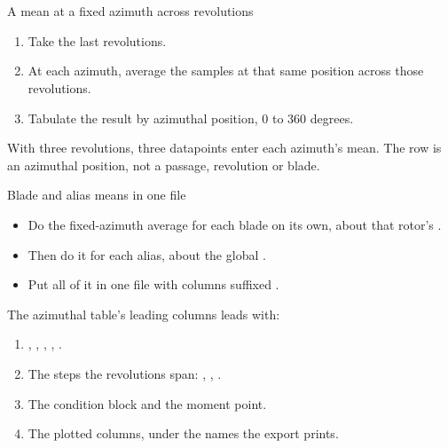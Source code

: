 %
\section{}

\begin{frame}{A mean at a fixed azimuth across revolutions}
\begin{enumerate}\small
  \item Take the last  revolutions.
  \item At each azimuth, average the samples at that same position across
        those revolutions.
  \item Tabulate the result by azimuthal position, 0 to 360 degrees.
\end{enumerate}
\begin{takeaway}
With three revolutions, three datapoints enter each azimuth's mean.
The row is an azimuthal position, not a passage, revolution or blade.
\end{takeaway}
\end{frame}

\begin{frame}{Blade and alias means in one file}
\begin{itemize}
  \item Do the fixed-azimuth average for each blade on its own, about that
        rotor's .
  \item Then do it for each alias, about the global .
  \item Put all of it in one file with columns suffixed
        .
\end{itemize}
\end{frame}

\begin{frame}{The azimuthal table's leading columns}
\small {} leads with:
\begin{enumerate}
  \item {}, , , ,
        .
  \item The steps the revolutions span:
        , , .
  \item The condition block and the moment point.
  \item The plotted columns, under the names the export prints.
\end{enumerate}
\end{frame}

